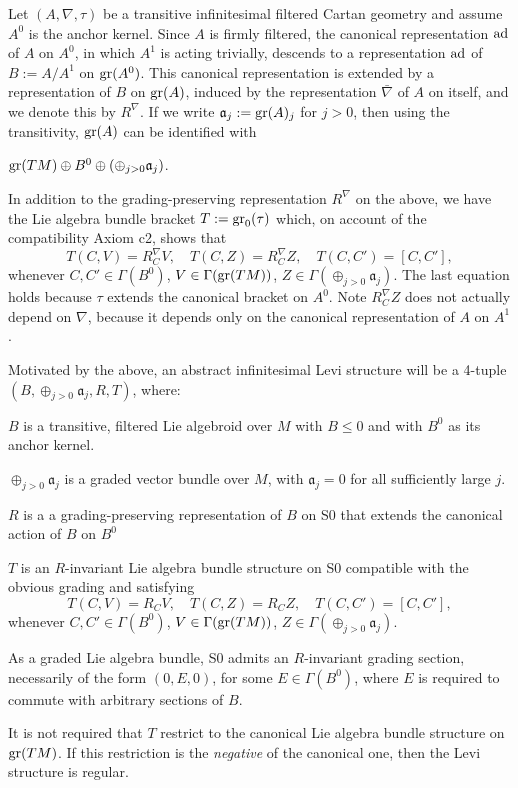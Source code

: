 \documentclass[leqno,12pt]{amsart} %
\begin{document}
Let $(A, \nabla, \tau)$ be a transitive infinitesimal filtered Cartan geometry and assume
$A^0$ is the anchor kernel. Since $A$ is firmly filtered, the canonical representation
$\operatorname{ad}$ of $A$ on $A^0$, in which $A^1$ is acting trivially, descends to a
representation $\operatorname{ad}$ of $B:=A/A^1$ on $\operatorname{\operatorname{gr}}(A^0)$. This canonical representation
is extended by a representation of $B$ on $\operatorname{\operatorname{gr}}(A)$, induced by the representation
$\bar\nabla $ of $A$ on itself, and we denote this by $R^\nabla$. If we write
${\mathfrak a}_j:=\operatorname{\operatorname{gr}}(A)_j$ for $j>0$, then using the transitivity, $\operatorname{\operatorname{gr}}(A)$ can
be identified with
\begin{conditions}
  \item[{\bfseries S0.}]
  $\operatorname{\operatorname{gr}}(TM)\oplus B^0 \oplus (\oplus_{j>0}{\mathfrak a}_j)$.
\end{conditions}
In addition to the grading-preserving representation $R^\nabla$ on the above, we have the
Lie algebra bundle bracket $T := \operatorname{\operatorname{gr}}_0(\tau)$ which, on account of the compatibility
Axiom c2, shows that
\begin{equation}
  \label{form_}
  T(C, V) = R^\nabla_C V,\quad
  T(C, Z) = R^\nabla_C Z,\quad
  T(C, C') = [C,C'],
\end{equation}
whenever $C,C'\in\Gamma(B^0)$, $V\in \Gamma(\operatorname{\operatorname{gr}}(TM))$,
$Z \in \Gamma(\oplus_{j>0} {\mathfrak a}_j)$. The last equation holds because $\tau$
extends the canonical bracket on $A^0$. Note $R^\nabla_C Z$ does not actually depend on
$\nabla $, because it depends only on the canonical representation of $A$ on $A^1$.

Motivated by the above, an {\df abstract infinitesimal Levi structure} will be a 4-tuple
$(B, \oplus_{j>0} {\mathfrak a}_j, R, T)$, where:
\begin{conditions}
  \item $B$ is a transitive, filtered Lie algebroid over $M$ with $B \le 0$ and with $B^0$
    as its anchor kernel.
  \item $\oplus_{j>0}{\mathfrak a}_j$ is a graded vector bundle over $M$, with
    ${\mathfrak a}_j=0$ for all sufficiently large $j$.
  \item $R$ is a a grading-preserving representation of $B$ on S0 that extends
    the canonical action of $B$ on $B^0$
  \item\label{chh0} $T$ is an $R$-invariant Lie algebra bundle structure on S0
    compatible with the obvious grading and satisfying
    \begin{equation*}
      T(C, V) = R_C V,\quad
      T(C, Z) = R_C Z,\quad
      T(C, C') = [C,C'],
    \end{equation*}
    whenever $C,C'\in\Gamma(B^0)$, $V\in \Gamma(\operatorname{\operatorname{gr}}(TM))$,
    $Z \in \Gamma(\oplus_{j>0} {\mathfrak a}_j)$.
  \item\label{six} As a graded Lie algebra bundle, S0 admits an $R$-invariant grading section,
    necessarily of the form $(0, E, 0)$, for some $E \in \Gamma(B^0)$, where $E$ is required to
    commute with arbitrary sections of $B$.
\end{conditions}
\noindent It is not required that $T$ restrict to the canonical Lie algebra bundle
structure on $\operatorname{\operatorname{gr}}(TM)$. If this restriction is the {\em negative} of the canonical
one, then the Levi structure is {\df regular}.
\end{document}

